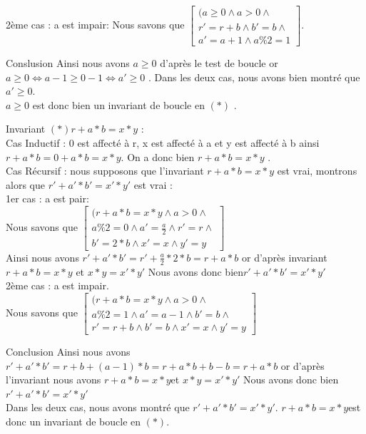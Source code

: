 \documentclass[12pt,a4paper]{report}
\begin{document}
\begin{flushleft}
2ème cas : a est impair:
Nous savons que $\left[ \begin{array}{c}(a\ge 0\wedge a>0\wedge \\
   r '= r+b\wedge b'=b  \wedge \\
a '=a+1\wedge a\%2=1\end{array}
\right]$.\\
\bigskip
\begin{Cas1}{Conslusion}
 Ainsi nous avons  $a\ge 0$ d’après le test de boucle or \medskip $  a\geq 0  \Leftrightarrow a-1 \ge 0-1 \Leftrightarrow a' \ge 0$ .
 Dans les deux cas, nous avons bien montré que  $ a' \ge 0 $.\\
 $a \geq 0$ est donc bien un invariant de boucle en $(*)$ .\\
\end{Cas1}
Invariant $(*) r+a*b = x*y$ :\\

Cas Inductif : 0   est affecté à r, x  est affecté à a  et y   est affecté à b  ainsi $ r +a*b = 0 + a*b = x*y $. On a donc bien $ r + a*b = x*y$ .\\
 
Cas Récursif : nous supposons que l’invariant  $ r + a*b = x*y$ est vrai, montrons alors que  $ r' + a'*b' = x'*y'$ est vrai :\\
\newpage 
1er cas : a est pair:\\
 Nous savons que $\left[ \begin{array}{c}(r + a*b = x*y\wedge a>0\wedge \\
a\%2=0\wedge a'= \frac{a}{2} \wedge r'=r \wedge\\
b'=2*b\wedge x'=x \wedge y'=y\end{array}
\right]$\\
Ainsi nous avons $ r' + a'*b' = r' + \frac{a}{2} * 2 * b  = r+ a*b$ or d’après
 invariant $ r+a*b = x*y $ et  $ x*y = x'*y'$ Nous avons donc bien\medskip $ r'+a'*b' = x'*y'$\\

2ème cas : a est impair.\\
 Nous savons que $\left[ \begin{array}{c}(r + a*b = x*y\wedge a>0\wedge \\
a\%2=1\wedge a'= a-1\wedge b'=b \wedge\\
r'=r+b\wedge b'=b\wedge x'=x \wedge y'=y\end{array}
\right]$ \\
 \begin{Cas1}{Conclusion}
 Ainsi nous avons $r'+ a'*b'=r+b+(a-1)*b = r+a*b + b-b = r+a*b  $ or d’après l’invariant nous avons  $ r+a*b = x*y $et $ x*y = x'*y' $ Nous avons donc bien $ r'+a'*b' = x'*y'$ \\

 Dans les deux cas, nous avons montré que $ r'+a'*b'= x'*y' $.
$ r+a*b=x*y $est donc un invariant de boucle en $(*) $.
\end{Cas1}
\end{flushleft}
\end{document}
